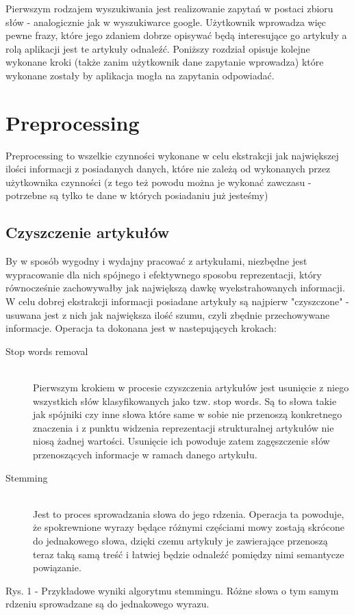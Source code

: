 Pierwszym rodzajem wyszukiwania jest realizowanie 
zapytań w postaci zbioru słów - analogicznie jak w wyszukiwarce google. Użytkownik wprowadza więc pewne frazy, które jego 
zdaniem dobrze opisywać będą interesujące go artykuły
 a rolą aplikacji jest te artykuły odnaleźć.
Poniższy rozdział opisuje kolejne wykonane kroki (także zanim użytkownik dane zapytanie wprowadza) które wykonane zostały by aplikacja mogła na zapytania odpowiadać.

\section{Preprocessing}
Preprocessing to wszelkie czynności wykonane w celu ekstrakcji jak największej ilości informacji z posiadanych danych, które nie zależą od wykonanych przez użytkownika czynności (z tego też powodu można je wykonać zawczasu - potrzebne są tylko te dane w których posiadaniu już jesteśmy)

\subsection{Czyszczenie artykułów}
By w sposób wygodny i wydajny pracować z artykułami, niezbędne jest wypracowanie dla nich spójnego i efektywnego sposobu reprezentacji, który równocześnie zachowywałby jak największą dawkę wyekstrahowanych informacji. W celu dobrej ekstrakcji informacji posiadane artykuły są najpierw "czyszczone" - usuwana jest z nich jak największa ilość szumu, czyli zbędnie przechowywane informacje.
Operacja ta dokonana jest w nastepujących krokach:

\begin{description}
  \item[Stop words removal] \hfill \\
 Pierwszym krokiem w procesie czyszczenia artykułów jest usunięcie z niego wszystkich słów klasyfikowanych jako tzw. stop words. Są to słowa takie jak spójniki czy inne słowa które same w sobie nie przenoszą konkretnego znaczenia i z punktu widzenia reprezentacji strukturalnej artykułów nie niosą żadnej wartości. Usunięcie ich powoduje zatem zagęszczenie słów przenoszących informacje w ramach danego artykułu.
 
  \item[Stemming] \hfill \\
Jest to proces sprowadzania słowa do jego rdzenia. Operacja ta powoduje, że spokrewnione wyrazy będące różnymi częściami mowy zostają skrócone do jednakowego słowa, dzięki czemu artykuły je zawierające przenoszą teraz taką samą treść i łatwiej będzie odnaleźć pomiędzy nimi semantycze powiązanie.
\end{description}
\begin{center}
 
 Rys. 1 - Przykładowe wyniki algorytmu stemmingu. Różne słowa o tym samym rdzeniu sprowadzane są do jednakowego wyrazu.
\end{center}

